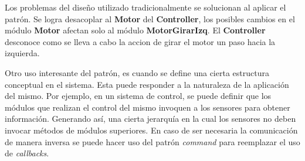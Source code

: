 Los problemas del diseño utilizado tradicionalmente se solucionan al aplicar el patrón. Se logra desacoplar al \textbf{Motor} del \textbf{Controller}, los posibles cambios en el módulo \textbf{Motor} afectan solo al módulo \textbf{MotorGirarIzq}. El \textbf{Controller} desconoce como se lleva a cabo la accion de girar el motor un paso hacia la izquierda.

Otro uso interesante del patrón, es cuando se define una cierta estructura conceptual en el sistema. Esta puede responder a la naturaleza de la aplicación del mismo. Por ejemplo, en un sistema de control, se puede definir que los módulos que realizan el control del mismo invoquen a los sensores para obtener información. Generando así, una cierta jerarquía en la cual los sensores no deben invocar métodos de módulos superiores. En caso de ser necesaria la comunicación de manera inversa se puede hacer uso del patrón \textit{command} para reemplazar el uso de \textit{callbacks}.


